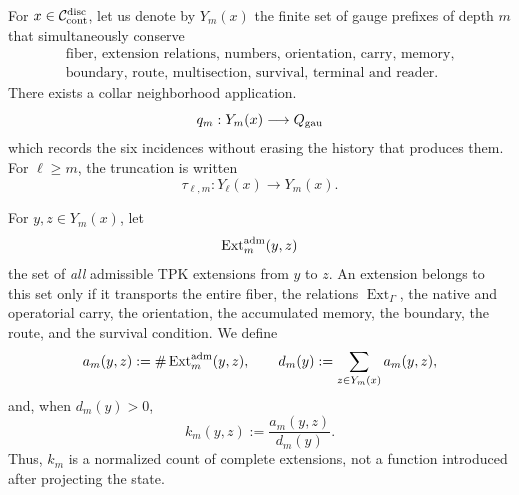 For \(x\in\mathcal C_{\rm cont}^{\rm disc}\), let us denote by
\(Y_m(x)\) the finite set of gauge prefixes of depth \(m\) that
simultaneously conserve
\begin{equation*}
\begin{gathered}
 \text{fiber, extension relations, numbers, orientation, carry, memory,}\\
 \text{boundary, route, multisection, survival, terminal and reader}.
\end{gathered}
\end{equation*}
There exists a collar neighborhood application.
\begin{equation}\label{eq:gauint-collar}
 q_m:Y_m(x)\longrightarrow Q_{\rm gau}
\end{equation}
which records the six incidences without erasing the history that produces them.
For \(\ell\ge m\), the truncation is written
\[
 \tau_{\ell,m}:Y_\ell(x)\longrightarrow Y_m(x).
\]

For \(y,z\in Y_m(x)\), let
\begin{equation}\label{eq:gauint-todas-extensiones}
 \operatorname{Ext}^{\rm adm}_{m}(y,z)
\end{equation}
the set of \emph{all} admissible TPK extensions from \(y\) to \(z\).
An extension belongs to this set only if it transports the entire fiber,
the relations \(\operatorname{Ext}_\Gamma\), the native and operatorial carry,
the orientation, the accumulated memory, the boundary, the route, and the
survival condition. We define
\begin{equation}\label{eq:gauint-conteo-kernel}
 a_m(y,z):=\#\operatorname{Ext}^{\rm adm}_m(y,z),
 \qquad
 d_m(y):=\sum_{z\in Y_m(x)}a_m(y,z),
\end{equation}
and, when \(d_m(y)>0\),
\begin{equation}\label{eq:gauint-kernel-normalizado}
 k_m(y,z):=\frac{a_m(y,z)}{d_m(y)}.
\end{equation}
Thus, \(k_m\) is a normalized count of complete extensions, not a
function introduced after projecting the state.

